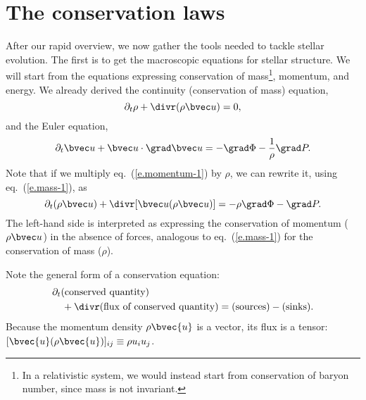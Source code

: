 
\section{The conservation laws}

After our rapid overview, we now gather the tools needed to tackle stellar evolution.  The first is to get the macroscopic equations for stellar structure. We will start from the equations expressing conservation of mass\footnote{In a relativistic system, we would instead start from conservation of baryon number, since mass is not invariant.}, momentum, and energy. We already derived the continuity (conservation of mass) equation,
\begin{equation}\label{e.mass-1}
\partial_{t}\rho + \divr(\rho\vu) = 0,
\end{equation}
and the Euler equation,
\begin{equation}\label{e.momentum-1}
\partial_{t}\vu + \vu\cdot\grad\vu = -\grad \Phi - \frac{1}{\rho}\grad P.
\end{equation}
Note that if we multiply eq.~(\ref{e.momentum-1}) by $\rho$, we can rewrite it, using eq.~(\ref{e.mass-1}), as
\begin{equation}\label{e.momentum-2}
	\partial_{t}(\rho\vu) + \divr[\vu(\rho\vu)] = -\rho\grad\Phi -\grad P.
\end{equation}
The left-hand side is interpreted as expressing the conservation of momentum ($\rho\vu$) in the absence of forces, analogous to eq.~(\ref{e.mass-1}) for the conservation of mass ($\rho$).

Note the general form of a conservation equation:
\begin{eqnarray*}
\lefteqn{\partial_{t}(\textrm{conserved quantity})}\\
 & & \mbox{} + \divr(\textrm{flux of conserved quantity}) =
 (\textrm{sources}) - (\textrm{sinks}).
\end{eqnarray*}
Because the momentum density $\rho\bvec{u}$ is a vector, its flux is a tensor: $[\bvec{u}(\rho\bvec{u})]_{ij} \equiv \rho u_{i}u_{j}$.

